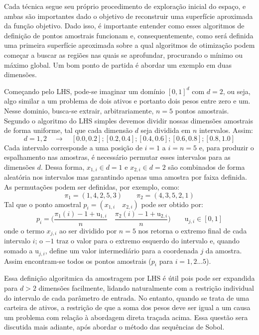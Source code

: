 \documentclass[12pt,a4paper]{article}
\begin{document}
Cada técnica segue seu próprio procedimento de exploração inicial do espaço, e ambas são importantes dado o objetivo de 
reconstruir uma superfície aproximada da função objetivo. Dado isso, é importante entender como esses algoritmos de definição de pontos amostrais
funcionam e, consequentemente, como será definida uma primeira superfície aproximada sobre a qual algoritmos de otimização podem começar a buscar as regiões nas quais 
se aprofundar, procurando o mínimo ou máximo global. Um bom ponto de partida é abordar um exemplo em duas dimensões.

Começando pelo LHS, pode-se imaginar um domínio $[0,1]^d$ com $d=2$, ou seja, algo similar a um problema de dois ativos e portanto dois pesos entre zero e um. Nesse dominio, busca-se extrair, arbitrariamente, $n=5$ pontos amostrais. 
Segundo o algoritmo do LHS simples devemos dividir nossas dimensões amostrais de forma uniforme, tal que cada dimensão $d$ seja dividida em $n$ intervalos. Assim:
$$ d=1,2 \quad \rightarrow \quad [0.0, 0.2]; [0.2, 0.4]; [0.4, 0.6]; [0.6, 0.8]; [0.8, 1.0] $$
Cada intervalo corresponde a uma posição de $i=1$ a $i=n=5$ e, para produzir o espalhamento nas amostras, é necessário permutar esses intervalos para as dimensões $d$. Dessa forma, $x_{1,i} \in d=1$ e $x_{2,i} \in d=2$ são combinados de forma aleatória nos intervalos mas garantindo apenas uma amostra por faixa definida. As permutações podem ser definidas, por exemplo, como:
$$ \pi_1 = (1, 4, 2, 5, 3) \qquad \pi_2 = (4, 3, 5, 2, 1) $$ 
Tal que o ponto amostral $p_i = (x_{1,i} \quad x_{2,i})$ pode ser obtido por:
$$p_i = \bigg ( \frac{\pi_1(i) - 1 + \mathrm{u}_{1,i}}{n} \quad \frac{\pi_2(i) - 1 + \mathrm{u}_{2,i}}{n} \bigg ) \qquad \mathrm{u}_{j,i} \in [0, 1]$$
onde o termo $x_{j,i}$ ao ser dividido por $n=5$ nos retorna o extremo final de cada intervalo $i$; o $-1$ traz o valor para o extremo esquerdo do intervalo e, quando somado a $\mathrm{u}_{j,i}$, define um valor intermediário para a coordenada $j$ da amostra. 
Assim encontram-se todos os pontos amostrais ($p_i$ para $i= 1, 2... 5$). 

Essa definição algoritmica da amostragem por LHS é útil pois pode ser expandida para $d>2$ dimensões facilmente, lidando naturalmente com a restrição individual do intervalo de cada parâmetro de entrada. No entanto, quando se trata de uma carteira de ativos, a restrição de que a soma dos pesos deve ser igual a um causa um problema com relação à abordagem direta traçada acima. Essa questão sera discutida mais adiante, após abordar o método das sequências de Sobol.
\end{document}
